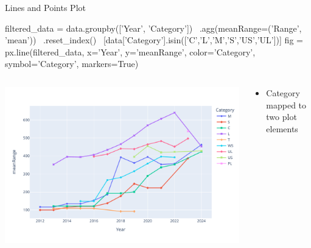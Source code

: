 \documentclass[ignorenonframetext,xcolor=x11names]{beamer}
\begin{document}
\begin{frame}[fragile]{Lines and Points Plot}
\footnotesize
\begin{pythoncode}
filtered_data = 
    data.groupby(['Year', 'Category']) \
       .agg(meanRange=('Range', 'mean')) \
       .reset_index() \
       [data['Category'].isin(['C','L','M','S','US','UL'])] 
fig = px.line(filtered_data, 
    x='Year', y='meanRange', color='Category', 
    symbol='Category', markers=True)
\end{pythoncode}
\begin{columns}
\begin{column}{.65\textwidth}
  \includegraphics[width=\textwidth]{px.fuel.linesPoints.pdf}
\end{column}
\begin{column}{.35\textwidth}
\footnotesize
\begin{itemize}
   \item Category mapped to two plot elements
\end{itemize}
\end{column}
\end{columns}
\end{frame}
\end{document}
